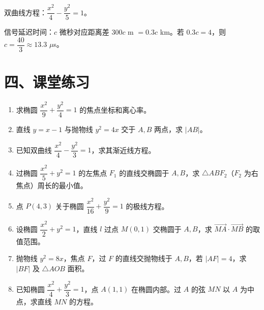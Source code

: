 \documentclass[12pt, a4paper]{ctexart}
\begin{document}
双曲线方程：$\dfrac{x^2}{4}-\dfrac{y^2}{5}=1$。

信号延迟时间：$c$ 微秒对应距离差 $300c$ m $=0.3c$ km。若 $0.3c=4$，则 $c=\dfrac{40}{3}\approx13.3$ $\mu$s。

\section*{\textcolor{tipgreen}{四、课堂练习}}

\begin{enumerate}[leftmargin=2em]
  \item 求椭圆 $\dfrac{x^2}{9}+\dfrac{y^2}{4}=1$ 的焦点坐标和离心率。

  \item 直线 $y=x-1$ 与抛物线 $y^2=4x$ 交于 $A,B$ 两点，求 $|AB|$。

  \item 已知双曲线 $\dfrac{x^2}{4}-\dfrac{y^2}{3}=1$，求其渐近线方程。

  \item 过椭圆 $\dfrac{x^2}{5}+y^2=1$ 的左焦点 $F_1$ 的直线交椭圆于 $A,B$，求 $\triangle ABF_2$（$F_2$ 为右焦点）周长的最小值。

  \item 点 $P(4,3)$ 关于椭圆 $\dfrac{x^2}{16}+\dfrac{y^2}{9}=1$ 的极线方程。

  \item 设椭圆 $\dfrac{x^2}{2}+y^2=1$，直线 $l$ 过点 $M(0,1)$ 交椭圆于 $A,B$，求 $\overrightarrow{MA}\cdot\overrightarrow{MB}$ 的取值范围。

  \item 抛物线 $y^2=8x$，焦点 $F$，过 $F$ 的直线交抛物线于 $A,B$，若 $|AF|=4$，求 $|BF|$ 及 $\triangle AOB$ 面积。

  \item 已知椭圆 $\dfrac{x^2}{4}+\dfrac{y^2}{3}=1$，点 $A(1,1)$ 在椭圆内部。过 $A$ 的弦 $MN$ 以 $A$ 为中点，求直线 $MN$ 的方程。
\end{enumerate}

\vspace{12pt}
\end{document}
